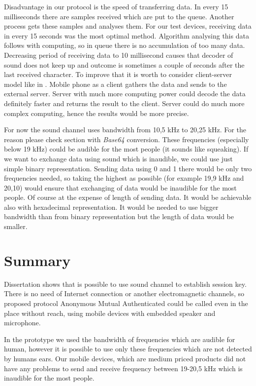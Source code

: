 \documentclass[11pt,titlepage]{article}
\theoremstyle{plain}
\begin{document}
Disadvantage in our protocol is the speed of transferring data. In every 15 milliseconds there are samples received which are put to the queue. Another process gets these samples and analyses them. For our test devices, receiving data in every 15 seconds was the most optimal method. Algorithm analysing this data follows with computing, so in queue there is no accumulation of too many data. Decreasing period of receiving data to 10 millisecond causes that decoder of sound does not keep up and outcome is sometimes a couple of seconds after the last received character. To improve that it is worth to consider client-server model like in \cite{chirp}. Mobile phone as a client gathers the data and sends to the external server. Server with much more computing power could decode the data definitely faster and returns the result to the client. Server could do much more complex computing, hence the results would be more precise.

\vspace{5mm}

For now the sound channel uses bandwidth from 10,5 kHz to 20,25 kHz. For the reason please check section with \textit{Base64} conversion. These frequencies (especially below 19 kHz) could be audible for the most people (it sounds like squeaking). If we want to exchange data using sound which is inaudible, we could use just simple binary representation. Sending data using 0 and 1 there would be only two frequencies needed, so taking the highest as possible (for example 19,9 kHz and 20,10) would ensure that exchanging of data would be inaudible for the most people. Of course at the expense of length of sending data. It would be achievable also with hexadecimal representation. It would be needed to use bigger bandwidth than from binary representation but the length of data would be smaller.

\section{Summary}

Dissertation shows that is possible to use sound channel to establish session key. There is no need of Internet connection or another electromagnetic channels, so proposed protocol Anonymous Mutual Authenticated could be called even in the place without reach, using mobile devices with embedded speaker and microphone. 

\vspace{5mm}


In the prototype we used the bandwidth of frequencies which are audible for human, however it is possible to use only these frequencies which are not detected by humans ears. Our mobile devices, which are medium priced products did not have any problems to send and receive frequency between 19-20,5 kHz which is inaudible for the most people.
\end{document}

